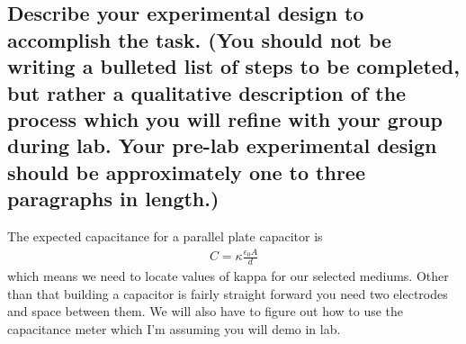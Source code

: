 \documentclass{article}
\begin{document}
\subsection*{Describe your experimental design to accomplish the task. (You should not be writing a bulleted list of steps to be completed, but rather a qualitative description of the process which you will refine with your group during lab. Your pre-lab experimental design should be approximately one to three paragraphs in length.)}

    The expected capacitance for a parallel plate capacitor is 
    \begin{align*}
        C = \kappa\frac{\epsilon_0 A}{d}
    \end{align*}
    which means we need to locate values of kappa for our selected mediums. Other than that building a capacitor is fairly straight forward you need two electrodes and space between them. We will also have to figure out how to use the capacitance meter which I'm assuming you will demo in lab. 
\end{document}
